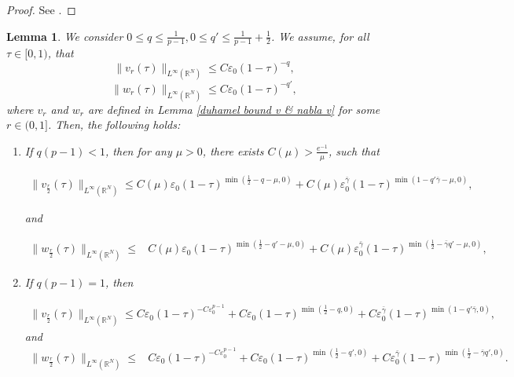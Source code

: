 \documentclass[11pt,a4paper]{article}
\newcommand{\1}{\mathbbm{1}}
\numberwithin{equation}{section}
\newcommand{\numberset}{\mathbb}
\newcommand{\R}{\numberset{R}}
\newtheorem{lemma}{Lemma}[section]
\theoremstyle{remark}
\begin{document}
\begin{proof}
    See \cite[Lemma 2.2]{GK1989}.
\end{proof}




\begin{lemma}\label{lemma iterations}
We consider $0\leq q\leq \frac{1}{p-1}, 0\leq q'\leq \frac{1}{p-1}+\frac{1}{2}$. We assume, for all $\tau\in [0,1)$, that
$$\|v_r(\tau)\|_{L^\infty(\R^N)}\leq C\varepsilon_0(1-\tau)^{-q},$$
$$\|w_r(\tau)\|_{L^\infty(\R^N)}\leq C\varepsilon_0(1-\tau)^{-q'},$$
where $v_r$ and $w_r$ are defined in Lemma \ref{duhamel bound v & nabla v} for some $r\in (0,1]$. Then, the following holds:

\begin{enumerate}[label=(\roman*)]

\item If $q(p-1)<1$, then for any $\mu>0$, there exists $C(\mu)>\frac{e^{-1}}{\mu}$, such that



\begin{equation}\label{q<1 v}
\begin{split}
\| v_{\frac{r}{2}}(\tau)\|_{L^\infty(\R^N)}\leq C(\mu)\varepsilon_0 (1-\tau)^{\min(\frac{1}{2}-q-\mu,0)}+C(\mu)\varepsilon_0^{\bar \gamma}(1-\tau)^{\min(1-q'\bar \gamma-\mu,0)},
\end{split}
\end{equation}

and

\begin{equation}\label{q<1 w}
\begin{split}
\|w_{\frac{r}{2}}(\tau)\|_{L^\infty(\R^N)}\leq& C(\mu)\varepsilon_0(1-\tau)^{\min(\frac{1}{2}-q'-\mu,0)}+C(\mu)\varepsilon_0^{\bar \gamma}(1-\tau)^{\min(\frac{1}{2}-\bar \gamma q'-\mu,0)},
\end{split}
\end{equation}
\item If $q(p-1)=1$, then



\begin{equation}\label{q=1 v}
\begin{split}
\| v_{\frac{r}{2}}(\tau)\|_{L^\infty(\R^N)}\leq C\varepsilon_0(1-\tau)^{-C\varepsilon_0^{p-1}}+C\varepsilon_0 (1-\tau)^{\min(\frac{1}{2}-q,0)}+C\varepsilon_0^{\bar \gamma}(1-\tau)^{\min(1-q'\bar \gamma,0)},
\end{split}
\end{equation}
and
\begin{equation}\label{q=1 w}
\begin{split}
\|w_{\frac{r}{2}}(\tau)\|_{L^\infty(\R^N)}\leq& C\varepsilon_0(1-\tau)^{-C\varepsilon_0^{p-1}}+C\varepsilon_0(1-\tau)^{\min(\frac{1}{2}-q',0)}+C\varepsilon_0^{\bar \gamma}(1-\tau)^{\min(\frac{1}{2}-\bar \gamma q',0)}.
\end{split}
\end{equation}
\end{enumerate}

\end{lemma}
\end{document}
